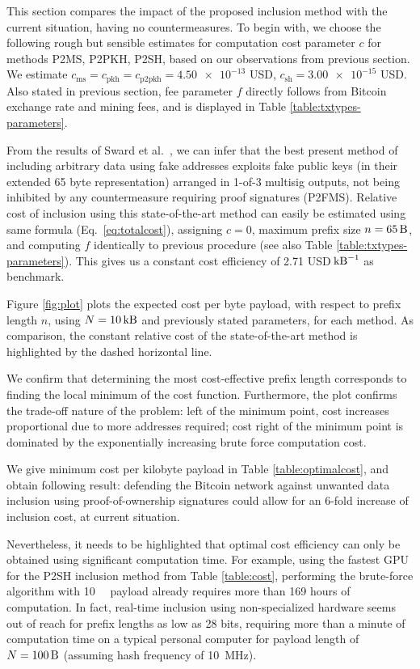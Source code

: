 \documentclass[a4paper,11pt,titlepage]{scrbook}
\begin{document}
This section compares the impact of the proposed inclusion method with the current situation, having no countermeasures.
To begin with, we choose the following rough but sensible estimates for computation cost parameter $c$ for methods P2MS, P2PKH, P2SH, based on our observations from previous section.
We estimate $c_\text{ms}=c_\text{pkh}=c_\text{p2pkh}=\num{4.50e-13}$ USD, $c_\text{sh} = \num{3.00e-15}$ USD.
Also stated in previous section, fee parameter $f$ directly follows from Bitcoin exchange rate and mining fees, and is displayed in Table \ref{table:txtypes-parameters}.

From the results of Sward et al.~\cite[cf.~Table 3]{sward_data_2018}, we can infer that the best present method of including arbitrary data using fake addresses exploits fake public keys (in their extended 65 byte representation) arranged in 1-of-3 multisig outputs, not being inhibited by any countermeasure requiring proof signatures (P2FMS).
Relative cost of inclusion using this state-of-the-art method can easily be estimated using same formula (Eq.~\ref{eq:totalcost}), assigning $c=0$, maximum prefix size $n=\SI{65}{\byte}$, and computing $f$ identically to previous procedure (see also Table \ref{table:txtypes-parameters}).
This gives us a constant cost efficiency of \num{2.71} USD$\,\si{\per\kilo\byte}$ as benchmark.

Figure \ref{fig:plot} plots the expected cost per byte payload, with respect to prefix length $n$, using $N=\SI{10}{\kilo\byte}$ and previously stated parameters, for each method.
As comparison, the constant relative cost of the state-of-the-art method is highlighted by the dashed horizontal line. 

We confirm that determining the most cost-effective prefix length corresponds to finding the local minimum of the cost function.
Furthermore, the plot confirms the trade-off nature of the problem: left of the minimum point, cost increases proportional due to more addresses required; cost right of the minimum point is dominated by the exponentially increasing brute force computation cost.

We give minimum cost per kilobyte payload in Table \ref{table:optimalcost},
and obtain following result: 
defending the Bitcoin network against unwanted data inclusion using proof-of-ownership signatures could allow for an 6-fold increase of inclusion cost, at current situation.

Nevertheless, it needs to be highlighted that optimal cost efficiency can only be obtained using significant computation time.
For example, using the fastest GPU for the P2SH inclusion method from Table \ref{table:cost}, performing the brute-force algorithm with \SI{10}{\kilo\byte} payload already requires more than 169 hours of computation.
In fact, real-time inclusion using non-specialized hardware seems out of reach for prefix lengths as low as 28 bits, requiring more than a minute of computation time on a typical personal computer for payload length of $N=\SI{100}{\byte}$ (assuming hash frequency of \SI{10}{\mega\hertz}).
\end{document}
